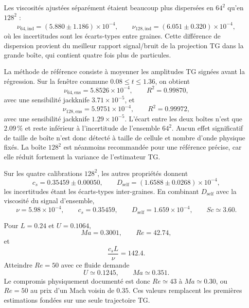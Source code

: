 \documentclass[11pt,a4paper]{article}
\begin{document}
Les viscosités ajustées séparément étaient beaucoup plus dispersées en $64^2$ qu'en $128^2$ :
\begin{equation}
  \nu_{64,\mathrm{ind}}=(5.880\pm1.186)\times10^{-4},
  \qquad
  \nu_{128,\mathrm{ind}}=(6.051\pm0.320)\times10^{-4},
\end{equation}
où les incertitudes sont les écarts-types entre graines. Cette différence de dispersion provient du meilleur rapport signal/bruit de la projection TG dans la grande boîte, qui contient quatre fois plus de particules.

La méthode de référence consiste à moyenner les amplitudes TG signées avant la régression. Sur la fenêtre commune $0.08\leq t\leq1.36$, on obtient
\begin{equation}
  \nu_{64,\mathrm{ens}}=5.8526\times10^{-4},
  \qquad R^2=0.99870,
\end{equation}
avec une sensibilité jackknife $3.71\times10^{-5}$, et
\begin{equation}
  \nu_{128,\mathrm{ens}}=5.9751\times10^{-4},
  \qquad R^2=0.99972,
\end{equation}
avec une sensibilité jackknife $1.29\times10^{-5}$. L'écart entre les deux boîtes n'est que $2.09\,\%$ et reste inférieur à l'incertitude de l'ensemble $64^2$. Aucun effet significatif de taille de boîte n'est donc détecté à taille de cellule et nombre d'onde physique fixés. La boîte $128^2$ est néanmoins recommandée pour une référence précise, car elle réduit fortement la variance de l'estimateur TG.

Sur les quatre calibrations $128^2$, les autres propriétés donnent
\begin{equation}
  c_s=0.35459\pm0.00050,
  \qquad
  D_{\mathrm{self}}=(1.6588\pm0.0268)\times10^{-4},
\end{equation}
les incertitudes étant les écarts-types inter-graines. En combinant $D_{\mathrm{self}}$ avec la viscosité du signal d'ensemble,
\begin{equation}
  \boxed{\nu=5.98\times10^{-4}},\qquad
  \boxed{c_s=0.35459},\qquad
  \boxed{D_{\mathrm{self}}=1.659\times10^{-4}},\qquad
  \boxed{Sc\simeq3.60}.
\end{equation}

Pour $L=0.24$ et $U=0.1064$,
\begin{equation}
  Ma=0.3001,\qquad Re=42.74,
\end{equation}
et
\begin{equation}
  \frac{c_sL}{\nu}=142.4.
\end{equation}
Atteindre $Re=50$ avec ce fluide demande
\begin{equation}
  U\simeq0.1245,\qquad Ma\simeq0.351.
\end{equation}
Le compromis physiquement documenté est donc $Re\simeq43$ à $Ma\simeq0.30$, ou $Re=50$ au prix d'un Mach voisin de $0.35$. Ces valeurs remplacent les premières estimations fondées sur une seule trajectoire TG.
\end{document}
